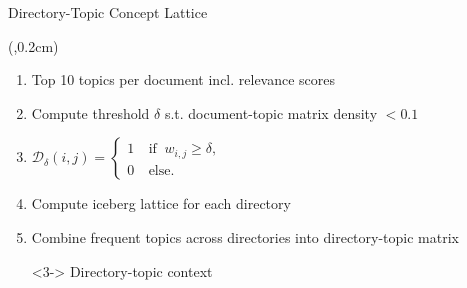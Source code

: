 \begin{frame}{Directory-Topic Concept Lattice}
    \begin{textblock*}{3.8cm}(\paperwidth-3.9cm,0.2cm) %
        \only<1>{
            
        }
    \end{textblock*}

    \begin{enumerate}
        \item Top 10 topics per document incl. relevance scores
        \item Compute threshold $\delta$ s.t. document-topic matrix density $< 0.1$
        \item $\mathcal{D}_\delta(i,j)=\left\{ \begin{array}{cl}
                        1 & \ \text{if } \ w_{i,j} \geq \delta, \\
                        0 & \ \text{else.}
                    \end{array} \right.$
        \item Compute iceberg lattice for each directory
        \item <2-> Combine frequent topics across directories into directory-topic matrix
        \item[\rightarrowfill] <3-> Directory-topic context
    \end{enumerate}



\end{frame}
